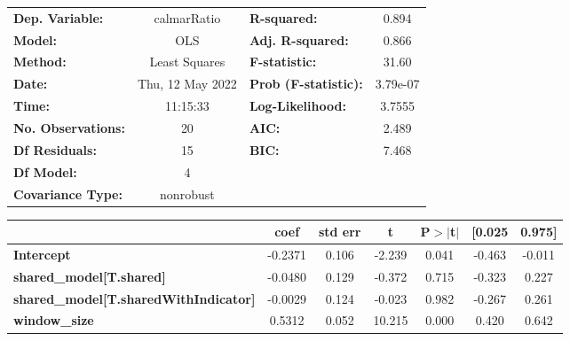 \begin{center}
\begin{tabular}{lclc}
\toprule
\textbf{Dep. Variable:}                       &   calmarRatio    & \textbf{  R-squared:         } &     0.894   \\
\textbf{Model:}                               &       OLS        & \textbf{  Adj. R-squared:    } &     0.866   \\
\textbf{Method:}                              &  Least Squares   & \textbf{  F-statistic:       } &     31.60   \\
\textbf{Date:}                                & Thu, 12 May 2022 & \textbf{  Prob (F-statistic):} &  3.79e-07   \\
\textbf{Time:}                                &     11:15:33     & \textbf{  Log-Likelihood:    } &    3.7555   \\
\textbf{No. Observations:}                    &          20      & \textbf{  AIC:               } &     2.489   \\
\textbf{Df Residuals:}                        &          15      & \textbf{  BIC:               } &     7.468   \\
\textbf{Df Model:}                            &           4      & \textbf{                     } &             \\
\textbf{Covariance Type:}                     &    nonrobust     & \textbf{                     } &             \\
\bottomrule
\end{tabular}
\begin{tabular}{lcccccc}
                                              & \textbf{coef} & \textbf{std err} & \textbf{t} & \textbf{P$> |$t$|$} & \textbf{[0.025} & \textbf{0.975]}  \\
\midrule
\textbf{Intercept}                            &      -0.2371  &        0.106     &    -2.239  &         0.041        &       -0.463    &       -0.011     \\
\textbf{shared\_model[T.shared]}              &      -0.0480  &        0.129     &    -0.372  &         0.715        &       -0.323    &        0.227     \\
\textbf{shared\_model[T.sharedWithIndicator]} &      -0.0029  &        0.124     &    -0.023  &         0.982        &       -0.267    &        0.261     \\
\textbf{window\_size}                         &       0.5312  &        0.052     &    10.215  &         0.000        &        0.420    &        0.642     \\

\end{tabular}
\end{center}
